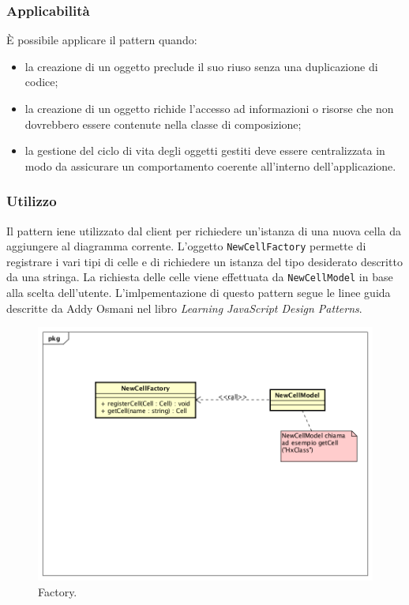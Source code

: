 \subsubsection{Applicabilità} È possibile applicare il pattern quando:
\begin{itemize}
	\item la creazione di un oggetto preclude il suo riuso senza una duplicazione di codice;
	\item la creazione di un oggetto richide l'accesso ad informazioni o risorse che non dovrebbero essere contenute nella classe di composizione;
	\item la gestione del ciclo di vita degli oggetti gestiti deve essere centralizzata in modo da assicurare un comportamento coerente all'interno dell'applicazione.
\end{itemize}

\subsubsection{Utilizzo}
Il pattern iene utilizzato dal client per richiedere un'istanza di una nuova cella da aggiungere al diagramma corrente. L'oggetto \texttt{NewCellFactory} permette di registrare i vari tipi di celle e di richiedere un istanza del tipo desiderato descritto da una stringa. La richiesta delle celle viene effettuata da \texttt{NewCellModel} in base alla scelta dell'utente.
L'imlpementazione di questo pattern segue le linee guida descritte da Addy Osmani nel libro \emph{Learning JavaScript Design Patterns}.
\begin{figure}[H] \label{fig:factory}
	\includegraphics[scale=0.8]{img/factoryExample.png}
	\caption{Factory.}
\end{figure}

